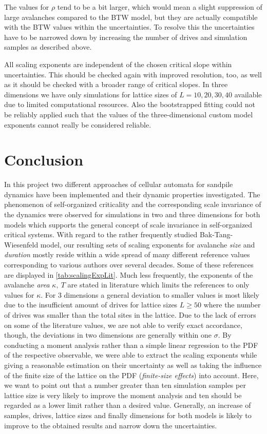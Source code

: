 The values for $\rho$ tend to be a bit larger, which would mean a slight suppression of large avalanches compared to
the BTW model, but they are actually compatible with the BTW values within the uncertainties. To resolve this the
uncertainties have to be narrowed down by increasing the number of drives and simulation samples as described above.

All scaling exponents are independent of the chosen critical slope within uncertainties. This should be checked again
with improved resolution, too, as well as it should be checked with a broader range of critical slopes.
In three dimensions we have only simulations for lattice sizes of $L=10,20,30,40$ available due to limited computational
resources. Also the bootstrapped fitting could not be reliably applied such that the values of the three-dimensional
custom model exponents cannot really be considered reliable.


\section{Conclusion}
\label{sec:conclusion}

In this project two different approaches of cellular automata for sandpile dynamics have been implemented and their
dynamic properties investigated. The phenomenon of self-organized criticality and the corresponding scale invariance
of the dynamics were observed for simulations in two and three dimensions for both models which supports the general
concept of scale invariance in self-organized critical systems. With regard to the rather frequently studied
Bak-Tang-Wiesenfeld model, our resulting sets of scaling exponents for avalanche \textit{size} and \textit{duration}
mostly reside within a wide spread of many different reference values corresponding to various authors over several
decades. Some of these references are displayed in \ref{tab:scalingExpLit}. Much less frequently, the exponents of the
avalanche \textit{area} $\kappa,\ T$ are stated in literature which limits the references to only values for $\kappa$.
For 3 dimensions a general deviation to smaller values is most likely due to the insufficient amount of drives for
lattice sizes $L\ge 50$ where the number of drives was smaller than the total sites in the lattice.
Due to the lack of errors on some of the literature values, we are not able to verify exact accordance, though,
the deviations in two dimensions are generally within one $\sigma$. By conducting a moment analysis rather than a
simple linear regression to the PDF of the respective observable, we were able to extract the scaling exponents while
giving a reasonable estimation on their uncertainty as well as taking the influence of the finite size of the lattice
on the PDF (\textit{finite-size effects}) into account. Here, we want to point out that a number greater than ten
simulation samples per lattice size is very likely to improve the moment analysis and ten should be regarded as a lower
limit rather than a desired value. Generally, an increase of samples, drives, lattice sizes and finally dimensions for
both models is likely to improve to the obtained results and narrow down the uncertainties.


